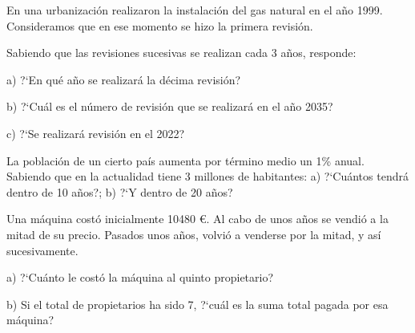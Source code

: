 \begin{mipropuesto}

En una urbanización realizaron la instalación del gas natural en el año 1999. Consideramos que en ese momento se hizo la primera revisión.

\vspace{2mm} Sabiendo que las revisiones sucesivas se realizan cada 3 años, responde:

\vspace{2mm} a) ?`En qué año se realizará la décima revisión?

b) ?`Cuál es el número de revisión que se realizará en el año 2035?

c) ?`Se realizará revisión en el 2022?
\end{mipropuesto}

\vspace{-8mm}
\begin{flushright}
\begin{footnotesize} \textcolor{gris}{}	\end{footnotesize}
\end{flushright}




\begin{mipropuesto}

La población de un cierto país aumenta por término medio un 1\% anual. Sabiendo que en la actualidad tiene 3 millones de habitantes:
a) ?`Cuántos tendrá dentro de 10 años?;  b) ?`Y dentro de 20 años?
\end{mipropuesto}

\vspace{-8mm}
\begin{flushright}
\begin{footnotesize} \textcolor{gris}{}	\end{footnotesize}
\end{flushright}



\begin{mipropuesto}

Una máquina costó inicialmente 10480 \euro. Al cabo de unos años se vendió a la mitad de su precio. Pasados unos años, volvió a venderse por la mitad, y así sucesivamente.

\vspace{2mm} a) ?`Cuánto le costó la máquina al quinto propietario?

b) Si el total de propietarios ha sido 7, ?`cuál es la suma total pagada por esa máquina?
\end{mipropuesto}

